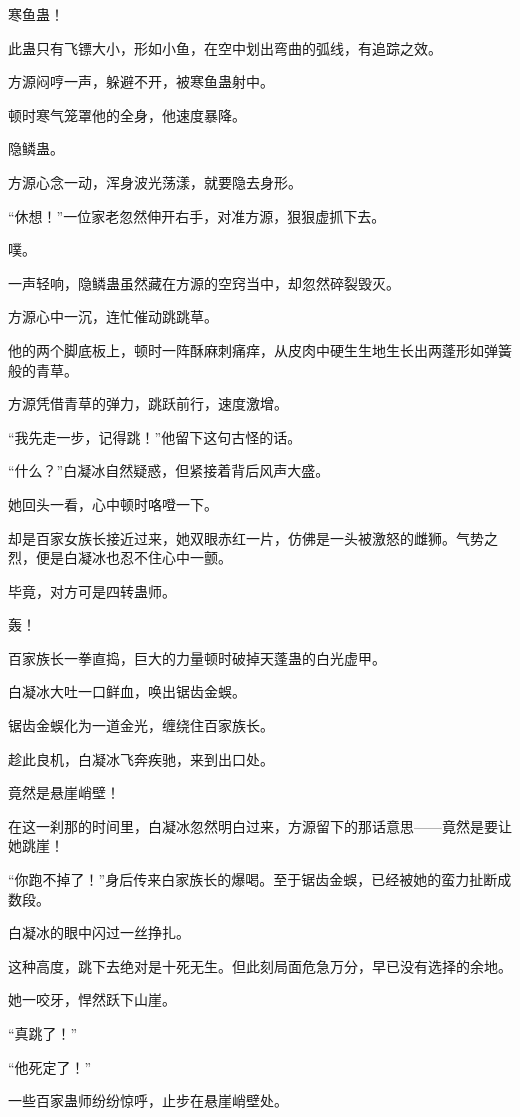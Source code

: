 \begin{this_body}
寒鱼蛊！

此蛊只有飞镖大小，形如小鱼，在空中划出弯曲的弧线，有追踪之效。

方源闷哼一声，躲避不开，被寒鱼蛊射中。

顿时寒气笼罩他的全身，他速度暴降。

隐鳞蛊。

方源心念一动，浑身波光荡漾，就要隐去身形。

“休想！”一位家老忽然伸开右手，对准方源，狠狠虚抓下去。

噗。

一声轻响，隐鳞蛊虽然藏在方源的空窍当中，却忽然碎裂毁灭。

方源心中一沉，连忙催动跳跳草。

他的两个脚底板上，顿时一阵酥麻刺痛痒，从皮肉中硬生生地生长出两蓬形如弹簧般的青草。

方源凭借青草的弹力，跳跃前行，速度激增。

“我先走一步，记得跳！”他留下这句古怪的话。

“什么？”白凝冰自然疑惑，但紧接着背后风声大盛。

她回头一看，心中顿时咯噔一下。

却是百家女族长接近过来，她双眼赤红一片，仿佛是一头被激怒的雌狮。气势之烈，便是白凝冰也忍不住心中一颤。

毕竟，对方可是四转蛊师。

轰！

百家族长一拳直捣，巨大的力量顿时破掉天蓬蛊的白光虚甲。

白凝冰大吐一口鲜血，唤出锯齿金蜈。

锯齿金蜈化为一道金光，缠绕住百家族长。

趁此良机，白凝冰飞奔疾驰，来到出口处。

竟然是悬崖峭壁！

在这一刹那的时间里，白凝冰忽然明白过来，方源留下的那话意思——竟然是要让她跳崖！

“你跑不掉了！”身后传来白家族长的爆喝。至于锯齿金蜈，已经被她的蛮力扯断成数段。

白凝冰的眼中闪过一丝挣扎。

这种高度，跳下去绝对是十死无生。但此刻局面危急万分，早已没有选择的余地。

她一咬牙，悍然跃下山崖。

“真跳了！”

“他死定了！”

一些百家蛊师纷纷惊呼，止步在悬崖峭壁处。


\end{this_body}
